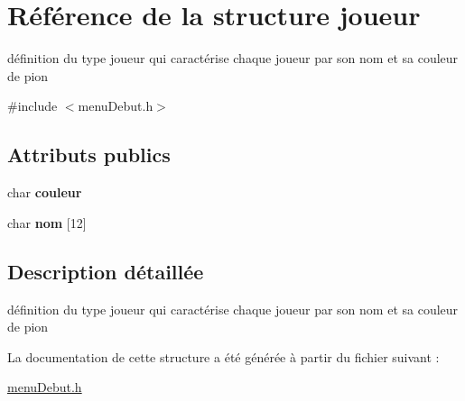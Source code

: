 \hypertarget{structjoueur}{\section{\-Référence de la structure joueur}
\label{structjoueur}
}


définition du type joueur qui caractérise chaque joueur par son nom et sa couleur de pion  




{\ttfamily \#include $<$menu\-Debut.\-h$>$}

\subsection*{\-Attributs publics}
\begin{DoxyCompactItemize}
\item 
\hypertarget{structjoueur_a528c5661016c6b4f800bfed85b8ece19}{char {\bfseries couleur}}\label{structjoueur_a528c5661016c6b4f800bfed85b8ece19}

\item 
\hypertarget{structjoueur_a6e986f1e6e43875c5fa7685f7dd870b0}{char {\bfseries nom} \mbox{[}12\mbox{]}}\label{structjoueur_a6e986f1e6e43875c5fa7685f7dd870b0}

\end{DoxyCompactItemize}


\subsection{\-Description détaillée}
définition du type joueur qui caractérise chaque joueur par son nom et sa couleur de pion 

\-La documentation de cette structure a été générée à partir du fichier suivant \-:\begin{DoxyCompactItemize}
\item 
\hyperlink{menuDebut_8h}{menu\-Debut.\-h}\end{DoxyCompactItemize}
